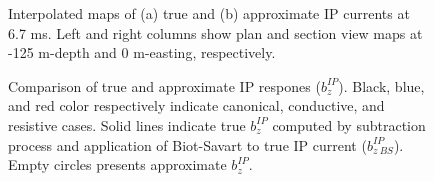 \documentclass[extra,mreferee]{gji}
\begin{document}
\begin{figure}
  \caption{Interpolated maps of (a) true and (b) approximate IP currents at 6.7 ms. Left and right columns show plan and section view maps at -125 m-depth and 0 m-easting, respectively. }
  \label{F:IPcurrent_PlanandSec_late}
\end{figure}

\begin{figure}
  \caption{Comparison of true and approximate IP respones ($b_z^{IP}$). Black, blue, and red color respectively indicate canonical, conductive, and resistive cases. Solid lines indicate true $b_z^{IP}$ computed by subtraction process and application of Biot-Savart to true IP current ($b_{z \ BS}^{IP}$). Empty circles presents approximate $b_z^{IP}$. }
  \label{F:True_vs_approx_IPresp}
\end{figure}
\clearpage
\end{document}
